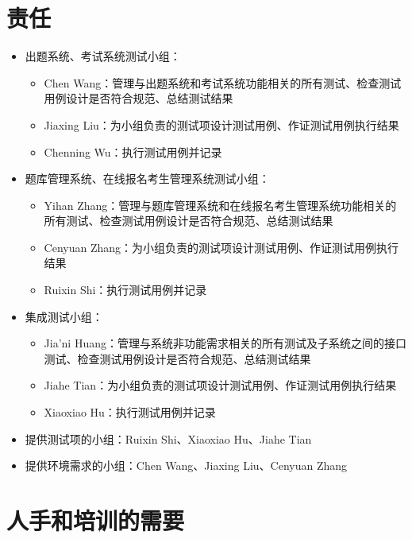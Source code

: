 \documentclass[hyperref, a4paper]{ctexart}
\providecommand{\tightlist}{%
  \setlength{\itemsep}{0pt}\setlength{\parskip}{0pt}}
\begin{document}
\hypertarget{ux8d23ux4efb}{%
\section{责任}\label{ux8d23ux4efb}}

\begin{itemize}
\tightlist
\item
  出题系统、考试系统测试小组：

  \begin{itemize}
  \tightlist
  \item
    Chen
    Wang：管理与出题系统和考试系统功能相关的所有测试、检查测试用例设计是否符合规范、总结测试结果
  \item
    Jiaxing Liu：为小组负责的测试项设计测试用例、作证测试用例执行结果
  \item
    Chenning Wu：执行测试用例并记录
  \end{itemize}
\item
  题库管理系统、在线报名考生管理系统测试小组：

  \begin{itemize}
  \tightlist
  \item
    Yihan
    Zhang：管理与题库管理系统和在线报名考生管理系统功能相关的所有测试、检查测试用例设计是否符合规范、总结测试结果
  \item
    Cenyuan Zhang：为小组负责的测试项设计测试用例、作证测试用例执行结果
  \item
    Ruixin Shi：执行测试用例并记录
  \end{itemize}
\item
  集成测试小组：

  \begin{itemize}
  \tightlist
  \item
    Jia'ni
    Huang：管理与系统非功能需求相关的所有测试及子系统之间的接口测试、检查测试用例设计是否符合规范、总结测试结果
  \item
    Jiahe Tian：为小组负责的测试项设计测试用例、作证测试用例执行结果
  \item
    Xiaoxiao Hu：执行测试用例并记录
  \end{itemize}
\item
  提供测试项的小组：Ruixin Shi、Xiaoxiao Hu、Jiahe Tian
\item
  提供环境需求的小组：Chen Wang、Jiaxing Liu、Cenyuan Zhang
\end{itemize}

\hypertarget{ux4ebaux624bux548cux57f9ux8badux7684ux9700ux8981}{%
\section{人手和培训的需要}\label{ux4ebaux624bux548cux57f9ux8badux7684ux9700ux8981}}
\end{document}
